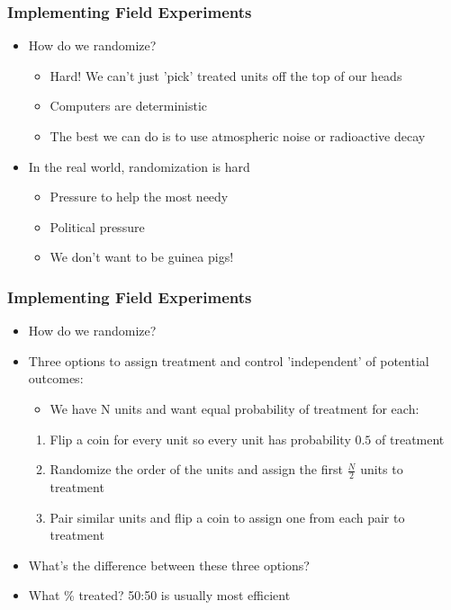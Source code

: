 \documentclass[xcolor=x11names,compress]{beamer}\usepackage[]{graphicx}\usepackage[]{color}
\renewcommand{\(}{\begin{columns}}
\renewcommand{\)}{\end{columns}}
\newcommand{\<}[1]{\begin{column}{#1}}
\renewcommand{\>}{\end{column}}
\begin{document}
\begin{frame}
\frametitle{Implementing Field Experiments}
\begin{itemize}
\item How do we randomize?
\begin{itemize}
\item Hard! We can't just 'pick' treated units off the top of our heads
\pause
\item Computers are deterministic
\pause
\item The best we can do is to use atmospheric noise or radioactive decay
\pause
\end{itemize}
\item In the real world, randomization is hard
\begin{itemize}
\item Pressure to help the most needy
\pause
\item Political pressure
\pause
\item We don't want to be guinea pigs!
\end{itemize}
\end{itemize}
\end{frame}


\begin{frame}
\frametitle{Implementing Field Experiments}
\begin{itemize}
\item How do we randomize?
\pause
\item Three options to assign treatment and control 'independent' of potential outcomes:
\pause
\begin{itemize}
\item We have N units and want equal probability of treatment for each:
\end{itemize}
\begin{enumerate}
\item Flip a coin for every unit so every unit has probability $0.5$ of treatment
\pause
\item Randomize the order of the units and assign the first $\frac{N}{2}$ units to treatment
\pause
\item Pair similar units and flip a coin to assign one from each pair to treatment
\pause
\end{enumerate}
\item What's the difference between these three options?
\pause
\item What \% treated? 50:50 is usually most efficient
\end{itemize}
\end{frame}
\end{document}
